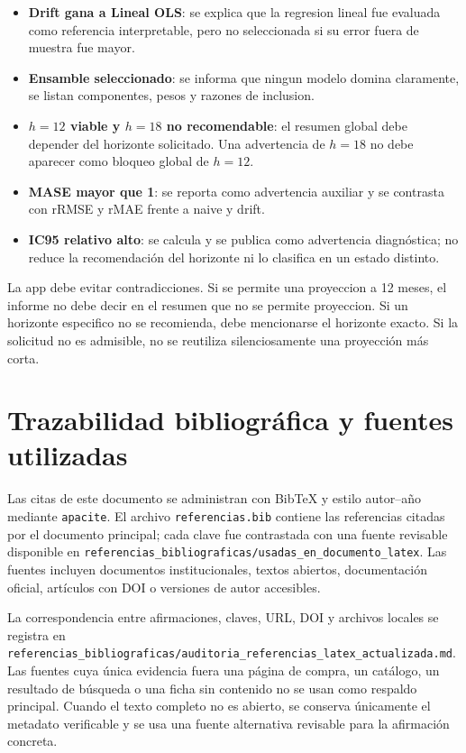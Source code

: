 ﻿\documentclass[12pt,letterpaper]{article}
\begin{document}
\begin{itemize}[leftmargin=*]
    \item \textbf{Drift gana a Lineal OLS}: se explica que la regresion lineal fue evaluada como referencia interpretable, pero no seleccionada si su error fuera de muestra fue mayor.
    \item \textbf{Ensamble seleccionado}: se informa que ningun modelo domina claramente, se listan componentes, pesos y razones de inclusion.
    \item \textbf{\(h=12\) viable y \(h=18\) no recomendable}: el resumen global debe depender del horizonte solicitado. Una advertencia de \(h=18\) no debe aparecer como bloqueo global de \(h=12\).
    \item \textbf{MASE mayor que 1}: se reporta como advertencia auxiliar y se contrasta con rRMSE y rMAE frente a naive y drift.
    \item \textbf{IC95 relativo alto}: se calcula y se publica como advertencia diagnóstica; no reduce la recomendación del horizonte ni lo clasifica en un estado distinto.
\end{itemize}

La app debe evitar contradicciones. Si se permite una proyeccion a 12 meses, el informe no debe decir en el resumen que no se permite proyeccion. Si un horizonte especifico no se recomienda, debe mencionarse el horizonte exacto. Si la solicitud no es admisible, no se reutiliza silenciosamente una proyección más corta.

\section{Trazabilidad bibliográfica y fuentes utilizadas}

Las citas de este documento se administran con BibTeX y estilo autor--año mediante \texttt{apacite}. El archivo \texttt{referencias.bib} contiene las referencias citadas por el documento principal; cada clave fue contrastada con una fuente revisable disponible en \texttt{referencias\_bibliograficas/usadas\_en\_documento\_latex}. Las fuentes incluyen documentos institucionales, textos abiertos, documentación oficial, artículos con DOI o versiones de autor accesibles.

La correspondencia entre afirmaciones, claves, URL, DOI y archivos locales se registra en \texttt{referencias\_bibliograficas/auditoria\_referencias\_latex\_actualizada.md}. Las fuentes cuya única evidencia fuera una página de compra, un catálogo, un resultado de búsqueda o una ficha sin contenido no se usan como respaldo principal. Cuando el texto completo no es abierto, se conserva únicamente el metadato verificable y se usa una fuente alternativa revisable para la afirmación concreta.
\end{document}
